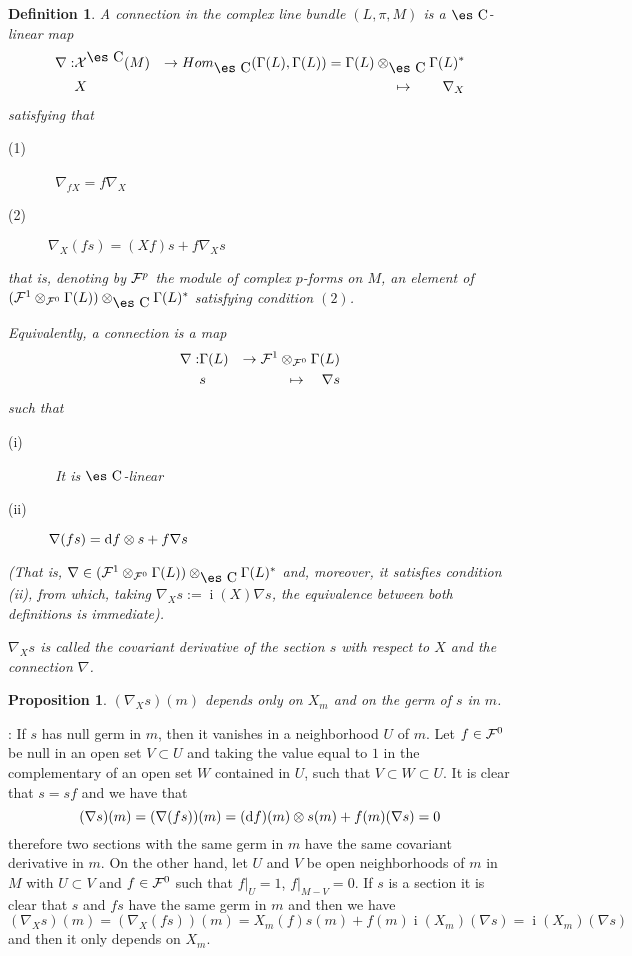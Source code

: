 \documentclass[12pt]{article}
\theoremstyle{plain}
\newtheorem{prop}{Proposition}
\newtheorem{definition}{Definition}
\def\beann{\begin{eqnarray*}}
\def\eeann{\end{eqnarray*}}
\def\qed{\ifvmode\removelastskip\fi
{\unskip\nobreak\hfil\penalty50\hbox{}\nobreak\hfil
\hbox{\vrule height1.2ex width1.2ex}\parfillskip=0pt
\finalhyphendemerits=0 \par\smallskip}}
\def\d{{\rm d}}
\def\Complex{\mbox{\es C}}
\def\inn{\mathop{i}\nolimits}
\begin{document}
\begin{definition}
A {\rm connection} in the complex line bundle
$(L,\pi ,M)$ is a $\Complex$-linear map
\beann
\nabla : & {\cal X}^{\Complex}(M) & \to
Hom_{\Complex}(\Gamma (L),\Gamma (L)) =
\Gamma (L) \otimes_{\Complex} \Gamma (L)^*
\\
& X & \mapsto \quad \quad \nabla_X
\eeann
satisfying that
\begin{description}
\item[{\rm (1)}] \
$\nabla_{fX} = f\nabla_X$
\item[{\rm (2)}]
$\nabla_X(fs) = (Xf)s + f\nabla_Xs$
\end{description}
that is, denoting by ${\cal F}^p$ the module of complex $p$-forms on
$M$,
an element of
$({\cal F}^1 \otimes_{{\cal F}^0} \Gamma (L))\otimes_{\Complex}\Gamma
(L)^*$
satisfying condition $(2)$.

Equivalently, a connection is a map
\beann
\nabla : & \Gamma(L) & \to
{\cal F}^1 \otimes_{{\cal F}^0} \Gamma (L)
\\
& s & \mapsto \quad \nabla s
\eeann
such that
\begin{description}
\item[{\rm (i)}] \
It is $\Complex$-linear
\item[{\rm (ii)}]
$\nabla (fs) = \d f \otimes s + f\nabla s$
\end{description}
(That is,
$\nabla \in ({\cal F}^1 \otimes_{{\cal F}^0} \Gamma (L))
\otimes_{\Complex} \Gamma (L)^*$
and, moreover, it satisfies condition (ii),
from which, taking
$\nabla_X s := \inn(X) \nabla s$,
the equivalence between both definitions
is immediate).

$\nabla_Xs$ is called the
{\rm covariant derivative}
of the section $s$ with respect to $X$
and the connection $\nabla$.
\label{nabla}
\end{definition}

\begin{prop}
$(\nabla_Xs)(m)$ depends only on $X_m$ and on the germ of $s$ in $m$.
\label{depen}
\end{prop}
:  If $s$ has null germ in $m$, then it vanishes
in a neighborhood $U$ of $m$. Let $f \in {\cal F}^0$ be null in an
open set $V \subset U$ and taking the value equal to $1$ in the
complementary of an open set $W$ contained in $U$, such that $V
\subset W \subset U$. It is clear that $s = sf$ and we have that
$$ (\nabla s)(m) = (\nabla (fs))(m) = (\d f)(m) \otimes s(m) +
f(m)(\nabla s) = 0 $$ therefore two sections with the same germ in
$m$ have the same covariant derivative in $m$. On the other hand,
let $U$ and $V$ be open neighborhoods of $m$ in $M$ with $U
\subset V$ and $f \in {\cal F}^0$ such that $f \vert_U = 1$, $f
\vert_{M-V} = 0$. If $s$ is a section it is clear that $s$ and
$fs$ have the same germ in $m$ and then we have $$ (\nabla_X s)(m)
= (\nabla_X (fs))(m) = X_m(f)s(m) + f(m)\inn(X_m)(\nabla s)
=\inn(X_m)(\nabla s) $$ and then it only depends on $X_m$. \qed
\end{document}
